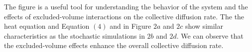 The figure is a useful tool for understanding the behavior of the system and the effects of excluded-volume interactions on the collective diffusion rate.
The the heat equation and Equation $(4)$ and in Figure $2a$ and $2c$ show similar characteristics as the stochastic simulations in $2b$ and $2d$. 
We can observe that the excluded-volume effects enhance the overall collective diffusion rate.










